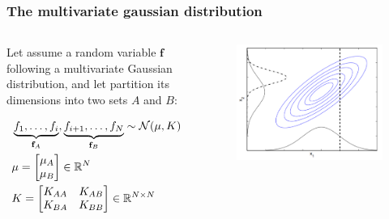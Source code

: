 \documentclass{beamer}
\begin{document}
\begin{frame}
    \frametitle{The multivariate gaussian distribution}

    \begin{columns}
        \begin{column}{0.6\textwidth}

        Let assume a random variable $\mathbf{f}$ following a multivariate
        Gaussian distribution, and let partition its dimensions into two
        sets $A$ and $B$:

        \begin{align*}
            &\underbrace{f_1, \dots, f_i}_{\mathbf{f}_A},\underbrace{f_{i+1}, \dots, f_N}_{\mathbf{f}_B}  \sim {\cal N}(\mu, K) \\
            &\mu = \begin{bmatrix}\mu_A\\
                                  \mu_B\end{bmatrix} \in \mathbb{R}^N\\
            &K = \begin{bmatrix}K_{AA} & K_{AB} \\
                                K_{BA} & K_{BB}\end{bmatrix} \in \mathbb{R}^{N \times N}
        \end{align*}

        \end{column}
        \begin{column}{0.4\textwidth}
            \begin{figure}
            \includegraphics[width=\textwidth]{./figures/mg.png}
            \end{figure}
        \end{column}
    \end{columns}
\end{frame}
\end{document}
